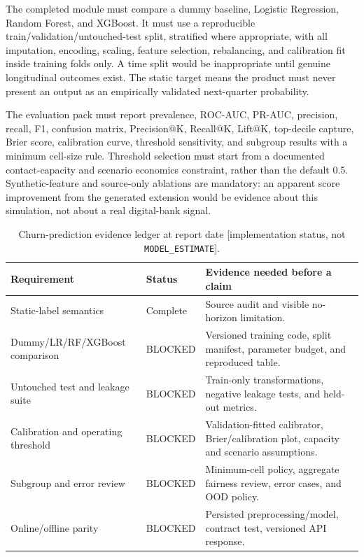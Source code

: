 \documentclass[a4paper,12pt]{article}
\newcommand{\modelestimate}{\texttt{MODEL\_ESTIMATE}}
\begin{document}
The completed module must compare a dummy baseline, Logistic Regression, Random Forest, and XGBoost. It must use a reproducible train/validation/untouched-test split, stratified where appropriate, with all imputation, encoding, scaling, feature selection, rebalancing, and calibration fit inside training folds only. A time split would be inappropriate until genuine longitudinal outcomes exist. The static target means the product must never present an output as an empirically validated next-quarter probability.

The evaluation pack must report prevalence, ROC-AUC, PR-AUC, precision, recall, F1, confusion matrix, Precision@K, Recall@K, Lift@K, top-decile capture, Brier score, calibration curve, threshold sensitivity, and subgroup results with a minimum cell-size rule. Threshold selection must start from a documented contact-capacity and scenario economics constraint, rather than the default 0.5. Synthetic-feature and source-only ablations are mandatory: an apparent score improvement from the generated extension would be evidence about this simulation, not about a real digital-bank signal.

\begin{table}[H]
\centering
\caption{Churn-prediction evidence ledger at report date [implementation status, not \modelestimate].}
\label{tab:churn-status}
\small
\begin{tabularx}{\textwidth}{P{0.29\textwidth}P{0.18\textwidth}Y}
\toprule
\textbf{Requirement} & \textbf{Status} & \textbf{Evidence needed before a claim}\\
\midrule
Static-label semantics & Complete & Source audit and visible no-horizon limitation.\\
Dummy/LR/RF/XGBoost comparison & BLOCKED & Versioned training code, split manifest, parameter budget, and reproduced table.\\
Untouched test and leakage suite & BLOCKED & Train-only transformations, negative leakage tests, and held-out metrics.\\
Calibration and operating threshold & BLOCKED & Validation-fitted calibrator, Brier/calibration plot, capacity and scenario assumptions.\\
Subgroup and error review & BLOCKED & Minimum-cell policy, aggregate fairness review, error cases, and OOD policy.\\
Online/offline parity & BLOCKED & Persisted preprocessing/model, contract test, versioned API response.\\
\bottomrule
\end{tabularx}
\end{table}
\end{document}
